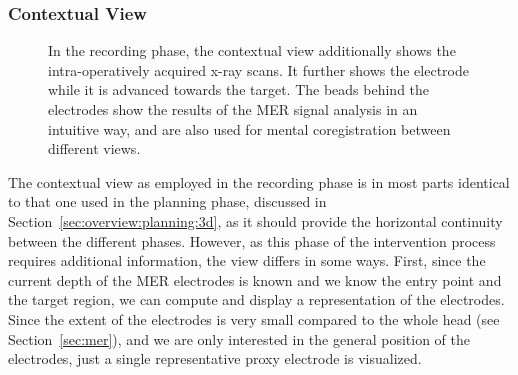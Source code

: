 \documentclass{vgtc}                          %
\begin{document}
\subsubsection{Contextual View}\label{sec:overview:recording:3d}
\begin{figure}
    \centering
    \caption{In the recording phase, the contextual view additionally shows the intra-operatively acquired x-ray scans. It further shows the electrode while it is advanced towards the target. The beads behind the electrodes show the results of the MER signal analysis in an intuitive way, and are also used for mental coregistration between different views.}
    \label{fig:recordingphase:3d}
\end{figure}

The contextual view as employed in the recording phase is in most parts identical to that one used in the planning phase, discussed in Section~\ref{sec:overview:planning:3d}, as it should provide the horizontal continuity between the different phases. However, as this phase of the intervention process requires additional information, the view differs in some ways. First, since the current depth of the MER electrodes is known and we know the entry point and the target region, we can compute and display a representation of the electrodes. Since the extent of the electrodes is very small compared to the whole head (see Section~\ref{sec:mer}), and we are only interested in the general position of the electrodes, just a single representative proxy electrode is visualized. 
\end{document}
